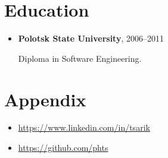 \documentclass[a4paper, 12pt]{article}
\newcommand{\position}[1]{
    \textbf{#1}}
\begin{document}
\section*{Education}

    \begin{itemize}

        \item \position{Polotsk State University}, 2006--2011

            Diploma in Software Engineering.

    \end{itemize}

\section*{Appendix}

    \begin{itemize}
        \item \href{https://www.linkedin.com/in/tsarik}{https://www.linkedin.com/in/tsarik}
        \item \href{https://github.com/phts}{https://github.com/phts}
    \end{itemize}
\end{document}
